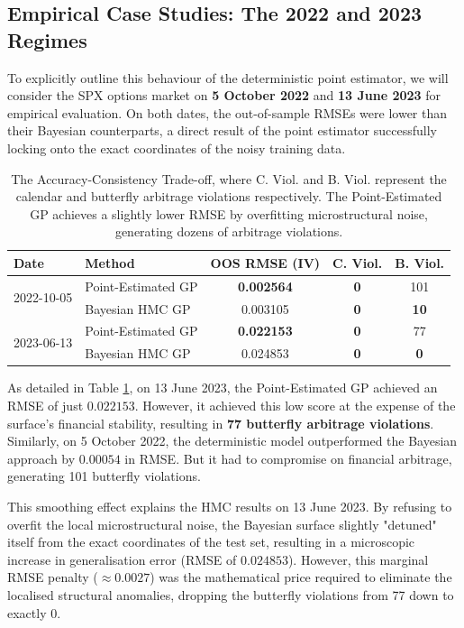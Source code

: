 \documentclass[12pt,oneside]{report}
\theoremstyle{definition}
\theoremstyle{remark}
\begin{document}
\subsection{Empirical Case Studies: The 2022 and 2023 Regimes}
To explicitly outline this behaviour of the deterministic point estimator, we will consider the SPX options market on \textbf{5 October 2022} and \textbf{13 June 2023} for empirical evaluation. On both dates, the out-of-sample RMSEs were lower than their Bayesian counterparts, a direct result of the point estimator successfully locking onto the exact coordinates of the noisy training data.

\begin{table}[htbp]
    \centering
    \begin{tabular}{llccc}
        \toprule
        \textbf{Date} & \textbf{Method} & \textbf{OOS RMSE (IV)} & \textbf{C. Viol.} & \textbf{B. Viol.} \\
        \midrule
        \multirow{2}{*}{2022-10-05} & Point-Estimated GP & \textbf{0.002564} & \textbf{0} & 101 \\
                                    & Bayesian HMC GP    & 0.003105 & \textbf{0} & \textbf{10}  \\
        \midrule
        \multirow{2}{*}{2023-06-13} & Point-Estimated GP & \textbf{0.022153} & \textbf{0} & 77 \\
                                    & Bayesian HMC GP    & 0.024853 & \textbf{0} & \textbf{0}  \\
        \bottomrule
    \end{tabular}
    \caption{The Accuracy-Consistency Trade-off, where C. Viol. and B. Viol. represent the calendar and butterfly arbitrage violations respectively. The Point-Estimated GP achieves a slightly lower RMSE by overfitting microstructural noise, generating dozens of arbitrage violations.}
    \label{tab:accuracy_consistency_tradeoff}
\end{table}

As detailed in Table \ref{tab:accuracy_consistency_tradeoff}, on 13 June 2023, the Point-Estimated GP achieved an RMSE of just $0.022153$. However, it achieved this low score at the expense of the surface's financial stability, resulting in \textbf{77 butterfly arbitrage violations}. Similarly, on 5 October 2022, the deterministic model outperformed the Bayesian approach by $0.00054$ in RMSE. But it had to compromise on financial arbitrage, generating 101 butterfly violations.

This smoothing effect explains the HMC results on 13 June 2023. By refusing to overfit the local microstructural noise, the Bayesian surface slightly "detuned" itself from the exact coordinates of the test set, resulting in a microscopic increase in generalisation error (RMSE of $0.024853$). However, this marginal RMSE penalty ($\approx 0.0027$) was the mathematical price required to eliminate the localised structural anomalies, dropping the butterfly violations from 77 down to exactly 0.
\end{document}
